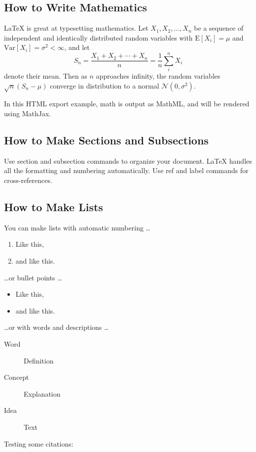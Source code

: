 \documentclass[graybox]{svmult}
\begin{document}
\subsection{How to Write Mathematics}

\LaTeX{} is great at typesetting mathematics. Let $X_1, X_2, \ldots, X_n$ be a sequence of independent and identically distributed random variables with $\text{E}[X_i] = \mu$ and $\text{Var}[X_i] = \sigma^2 < \infty$, and let
$$S_n = \frac{X_1 + X_2 + \cdots + X_n}{n}
      = \frac{1}{n}\sum_{i}^{n} X_i$$
denote their mean. Then as $n$ approaches infinity, the random variables $\sqrt{n}(S_n - \mu)$ converge in distribution to a normal $\mathcal{N}(0, \sigma^2)$.

In this HTML export example, math is output as MathML, and will be rendered using MathJax.

\subsection{How to Make Sections and Subsections}

Use section and subsection commands to organize your document. \LaTeX{} handles all the formatting and numbering automatically. Use ref and label commands for cross-references.

\subsection{How to Make Lists}

You can make lists with automatic numbering \dots

\begin{enumerate}
\item Like this,
\item and like this.
\end{enumerate}
\dots or bullet points \dots
\begin{itemize}
\item Like this,
\item and like this.
\end{itemize}
\dots or with words and descriptions \dots
\begin{description}
\item[Word] Definition
\item[Concept] Explanation
\item[Idea] Text
\end{description}

Testing some citations: \cite{NTLKProject2015,Bond2014}
\end{document}
